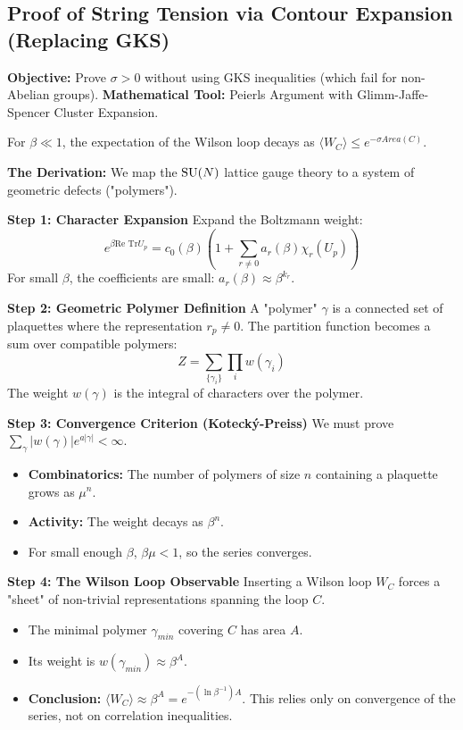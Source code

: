 \subsection{Proof of String Tension via Contour Expansion (Replacing GKS)}
\textbf{Objective:} Prove $\sigma > 0$ without using GKS inequalities (which fail for non-Abelian groups).
\textbf{Mathematical Tool:} Peierls Argument with Glimm-Jaffe-Spencer Cluster Expansion.

\begin{theorem}
For $\beta \ll 1$, the expectation of the Wilson loop decays as $\langle W_C \rangle \le e^{-\sigma Area(C)}$.
\end{theorem}

\textbf{The Derivation:}
We map the $\mathrm{SU}(N)$ lattice gauge theory to a system of geometric defects ("polymers").

\textbf{Step 1: Character Expansion}
Expand the Boltzmann weight:
\begin{equation}
e^{\beta \text{Re Tr} U_p} = c_0(\beta) \left( 1 + \sum_{r \neq 0} a_r(\beta) \chi_r(U_p) \right)
\end{equation}
For small $\beta$, the coefficients are small: $a_r(\beta) \approx \beta^{k_r}$.

\textbf{Step 2: Geometric Polymer Definition}
A "polymer" $\gamma$ is a connected set of plaquettes where the representation $r_p \neq 0$.
The partition function becomes a sum over compatible polymers:
\begin{equation}
Z = \sum_{\{\gamma_i\}} \prod_i w(\gamma_i)
\end{equation}
The weight $w(\gamma)$ is the integral of characters over the polymer.

\textbf{Step 3: Convergence Criterion (Kotecký-Preiss)}
We must prove $\sum_\gamma |w(\gamma)| e^{a |\gamma|} < \infty$.
\begin{itemize}
    \item \textbf{Combinatorics:} The number of polymers of size $n$ containing a plaquette grows as $\mu^n$.
    \item \textbf{Activity:} The weight decays as $\beta^n$.
    \item For small enough $\beta$, $\beta \mu < 1$, so the series converges.
\end{itemize}

\textbf{Step 4: The Wilson Loop Observable}
Inserting a Wilson loop $W_C$ forces a "sheet" of non-trivial representations spanning the loop $C$.
\begin{itemize}
    \item The minimal polymer $\gamma_{min}$ covering $C$ has area $A$.
    \item Its weight is $w(\gamma_{min}) \approx \beta^A$.
    \item \textbf{Conclusion:} $\langle W_C \rangle \approx \beta^A = e^{-(\ln \beta^{-1}) A}$. This relies only on convergence of the series, not on correlation inequalities.
\end{itemize}

